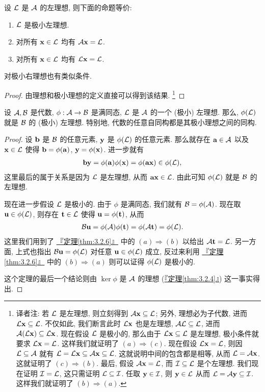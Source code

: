 \documentclass[lang=cn,zihao=-4,twoside,fontset=none]{textbook}
\def\eq#1{\[\begin{aligned}{}#1\end{aligned}\]}
\newcommand{\thmref}[1]{\hyperref[#1]{『定理\textnormal{\ref*{#1}}』}}
\newcommand{\nalph}{\textnormal{(\alph*)}}
\begin{document}
\begin{theorem}
    \label{thm:3.2.6}%
    设 ${\mathcal L}$ 是 ${\mathcal A}$ 的左理想, 则下面的命题等价:
    \begin{enumerate}[label=\nalph]
        \item ${\mathcal L}$ 是极小左理想.
        \item 对所有 ${\mathbf x}\in{\mathcal L}$ 均有 ${\mathcal A}{\mathbf x}={\mathcal L}$.
        \item 对所有 ${\mathbf x}\in{\mathcal L}$ 均有 ${\mathcal L}{\mathbf x}={\mathcal L}$. 
    \end{enumerate}
    对极小右理想也有类似条件.
\end{theorem}
\begin{proof}
    由理想和极小理想的定义直接可以得到该结果. \footnote{译者注: 若 ${\mathcal L}$ 是左理想, 则立刻得到 ${\mathcal A}{\mathbf x}\subseteq{\mathcal L}$; 另外, 理想必为子代数, 进而 ${\mathcal L}{\mathbf x}\subseteq{\mathcal L}$. 不仅如此, 我们断言此时 ${\mathcal L}{\mathbf x}$ 也是左理想, ${\mathcal A}{\mathcal L}\subseteq{\mathcal L}$, 进而 ${\mathcal A}({\mathcal L}{\mathbf x})\subseteq{\mathcal L}{\mathbf x}$. 现在假设 ${\mathcal L}$ 是极小的, 那么由于 ${\mathcal L}{\mathbf x}\subseteq{\mathcal L}$ 是左理想, 极小条件就要求 ${\mathcal L}{\mathbf x}={\mathcal L}$. 这样我们就证明了 $(a)\Rightarrow(c)$. 现在假设 ${\mathcal L}{\mathbf x}={\mathcal L}$, 则因 ${\mathcal L}\subseteq{\mathcal A}$ 就有 ${\mathcal L}={\mathcal L}{\mathbf x}\subseteq{\mathcal A}{\mathbf x}\subseteq{\mathcal L}$. 这就说明中间的包含都是相等, 从而 ${\mathcal L}={\mathcal A}{\mathbf x}$. 这就证明了 $(c)\Rightarrow(b)$. 最后, 假设 ${\mathcal A}{\mathbf x}={\mathcal L}$, 而 ${\mathcal I}\subseteq{\mathcal L}$ 是个左理想. 我们现在证明 ${\mathcal I}={\mathcal L}$, 这只需证明 ${\mathcal L}\subseteq{\mathcal I}$. 任取 ${\mathbf y}\in{\mathcal I}$, 则 ${\mathbf y}\in{\mathcal L}$ 从而 ${\mathcal L}={\mathcal A}{\mathbf y}\subseteq{\mathcal I}$. 这样我们就证明了 $(b)\Rightarrow(a)$.  }
\end{proof}

\begin{theorem}
    \label{thm:3.2.7}%
    设 ${\mathcal A},{\mathcal B}$ 是代数, $\phi:{\mathcal A}\to{\mathcal B}$ 是满同态, ${\mathcal L}$ 是 ${\mathcal A}$ 的一个 (极小) 左理想. 那么, $\phi({\mathcal L})$ 就是 ${\mathcal B}$ 的 (极小) 左理想. 特别地, 代数的任意自同构都是其极小理想之间的同构. 
\end{theorem}

\begin{proof}
    设 ${\mathbf b}$ 是 ${\mathcal B}$ 的任意元素, ${\mathbf y}$ 是 $\phi({\mathcal L})$ 的任意元素. 那么就存在 ${\mathbf a}\in{\mathcal A}$ 以及 ${\mathbf x}\in{\mathcal L}$ 使得 ${\mathbf b}=\phi({\mathbf a})$, ${\mathbf y}=\phi({\mathbf x})$. 进一步就有 
    \eq{
        \bfb\bfy=\phi(\bfa)\phi(\bfx)=\phi(\bfa\bfx)\in\phi(\mL),
    }
    这里最后的属于关系是因为 ${\mathcal L}$ 是左理想, 从而 ${\mathbf a}{\mathbf x}\in{\mathcal L}$. 由此可知 $\phi({\mathcal L})$ 就是 ${\mathcal B}$ 的左理想. 

    现在进一步假设 ${\mathcal L}$ 是极小的. 由于 $\phi$ 是满同态, 我们就有 ${\mathcal B}=\phi({\mathcal A})$. 现在取 ${\mathbf u}\in\phi({\mathcal L})$, 则存在 ${\mathbf t}\in{\mathcal L}$ 使得 ${\mathbf u}=\phi({\mathbf t})$, 从而  
    \eq{
        \mB\bfu=\phi(\mA)\phi(\bft)=\phi(\mA\bft)=\phi(\mL).
    }
    这里我们用到了 \thmref{thm:3.2.6} 中的 $(a)\Rightarrow(b)$ 以给出 ${\mathcal A}{\mathbf t}={\mathcal L}$. 另一方面, 上式也指出 ${\mathcal B}{\mathbf u}=\phi({\mathcal L})$ 对任意 ${\mathbf u}\in\phi({\mathcal L})$ 成立, 反过来利用 \thmref{thm:3.2.6} 中的 $(b)\Rightarrow(a)$ 则可以证得 $\phi({\mathcal L})$ 是极小的. 

    这个定理的最后一个结论则由 $\ker\phi$ 是 ${\mathcal A}$ 的理想 (\thmref{thm:3.2.4}) 这一事实得出.
\end{proof}
\end{document}
